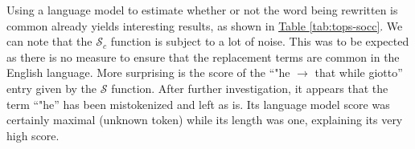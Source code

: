 \documentclass[a4paper, 11pt, onepage]{scrreprt}
\newcommand\tableref[1]{\hyperref[#1]{Table \ref*{#1}}}
\begin{document}
Using a language model to estimate whether or not the word being
rewritten is common already yields interesting results, as shown in
\tableref{tab:tops-socc}. We can note that the $\mathcal{S}_c$
function is subject to a lot of noise. This was to be expected as
there is no measure to ensure that the replacement terms are common in
the English language. More surprising is the score of the “"he
$\rightarrow$ that while giotto” entry given by the $\mathcal{S}$
function. After further investigation, it appears that the term “"he”
has been mistokenized and left as is. Its language model score was
certainly maximal (unknown token) while its length was one, explaining
its very high score.

\begin{table}[H]
  \centering
  \caption{$\mathcal{S}$ \& $\mathcal{S}_c$ top 10 rewritings}
  \noindent{}
  \label{tab:tops-socc}
\end{table}
\end{document}
